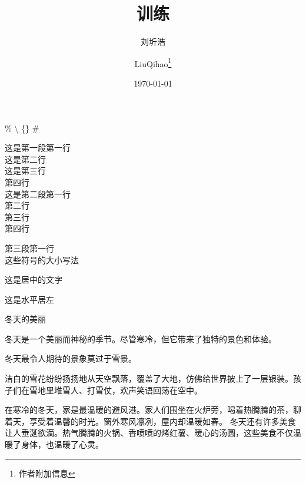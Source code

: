 \documentclass{article} %
\title{训练} %
\author{刘圻浩 \and LiuQihao\thanks{作者附加信息}} %
\date{\today} %
\begin{document}
\maketitle %

\% %
\textbackslash %
\{\} %
\# %

这是第一段第一行\\
这是第二行\\
这是第三行\\
第四行\\

这是第二段第一行\\ %
第二行\\
第三行\\
第四行\par %
第三段第一行\\
这些符号的大小\hspace{1em}写法\\ %
\begin{center} %
    这是居中的文字
\end{center}
\begin{flushleft}
    这是水平居左
\end{flushleft}\par
\begin{center}
冬天的美丽   
\end{center}\par
冬天是一个美丽而神秘的季节。尽管寒冷，但它带来了独特的景色和体验。
\begin{flushright}
冬天最令人期待的景象莫过于雪景。
\end{flushright}\par
洁白的雪花纷纷扬扬地从天空飘落，覆盖了大地，仿佛给世界披上了一层银装。孩子们在雪地里堆雪人、打雪仗，欢声笑语回荡在空中。\par
在寒冷的冬天，家是最温暖的避风港。家人们围坐在火炉旁，喝着热腾腾的茶，聊着天，享受着温馨的时光。窗外寒风凛冽，屋内却温暖如春。
冬天还有许多美食让人垂涎欲滴。热气腾腾的火锅、香喷喷的烤红薯、暖心的汤圆，这些美食不仅温暖了身体，也温暖了心灵。\par\noindent
\end{document}
